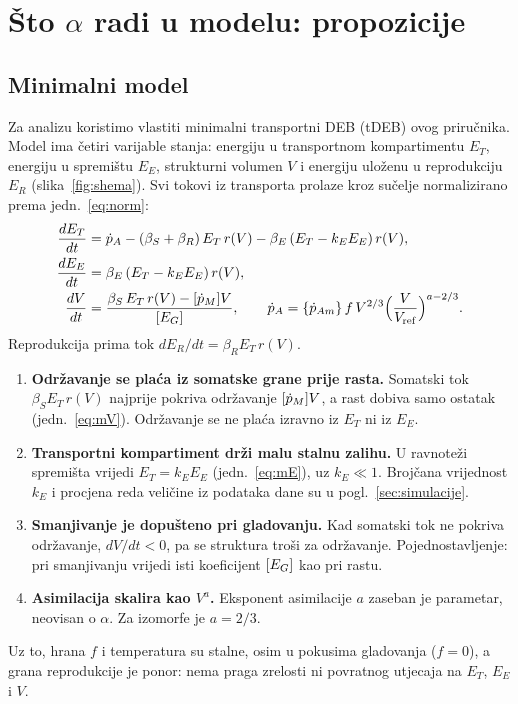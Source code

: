 \section{Što $\alpha$ radi u modelu: propozicije}\label{sec:propozicije}

\subsection{Minimalni model}

Za analizu koristimo vlastiti minimalni transportni DEB (tDEB) ovog priručnika. Model ima četiri varijable stanja: energiju u transportnom kompartimentu $E_T$, energiju u spremištu $E_E$, strukturni volumen $V$ i energiju uloženu u reprodukciju $E_R$ (slika~\ref{fig:shema}). Svi tokovi iz transporta prolaze kroz sučelje normalizirano prema jedn.~\eqref{eq:norm}:
\begin{align}
\frac{dE_T}{dt}&=\dot{p}_A-(\beta_S+\beta_R)\,E_T\,r(V)-\beta_E\,(E_T-k_E E_E)\,r(V), \label{eq:mT}\\
\frac{dE_E}{dt}&=\beta_E\,(E_T-k_E E_E)\,r(V), \label{eq:mE}\\
\frac{dV}{dt}&=\frac{\beta_S\,E_T\,r(V)-[\dot p_M] V}{[E_G]}, \qquad
\dot{p}_A=\{\dot p_{Am}\}\,f\,V^{2/3}\Big(\frac{V}{V_{\mathrm{ref}}}\Big)^{a-2/3}. \label{eq:mV}
\end{align}
Reprodukcija prima tok $dE_R/dt=\beta_R E_T\,r(V)$.

\begin{kljucno}
\begin{enumerate}[leftmargin=1.8em,label=(\roman*)]
\item \textbf{Održavanje se plaća iz somatske grane prije rasta.} Somatski tok $\beta_S E_T\,r(V)$ najprije pokriva održavanje $[\dot p_M] V$, a rast dobiva samo ostatak (jedn.~\eqref{eq:mV}). Održavanje se ne plaća izravno iz $E_T$ ni iz $E_E$.
\item \textbf{Transportni kompartiment drži malu stalnu zalihu.} U ravnoteži spremišta vrijedi $E_T=k_E E_E$ (jedn.~\eqref{eq:mE}), uz $k_E\ll1$. Brojčana vrijednost $k_E$ i procjena reda veličine iz podataka dane su u pogl.~\ref{sec:simulacije}.
\item \textbf{Smanjivanje je dopušteno pri gladovanju.} Kad somatski tok ne pokriva održavanje, $dV/dt<0$, pa se struktura troši za održavanje. Pojednostavljenje: pri smanjivanju vrijedi isti koeficijent $[E_G]$ kao pri rastu.
\item \textbf{Asimilacija skalira kao $V^{a}$.} Eksponent asimilacije $a$ zaseban je parametar, neovisan o $\alpha$. Za izomorfe je $a=2/3$.
\end{enumerate}
Uz to, hrana $f$ i temperatura su stalne, osim u pokusima gladovanja ($f=0$), a grana reprodukcije je ponor: nema praga zrelosti ni povratnog utjecaja na $E_T$, $E_E$ i $V$.
\end{kljucno}

